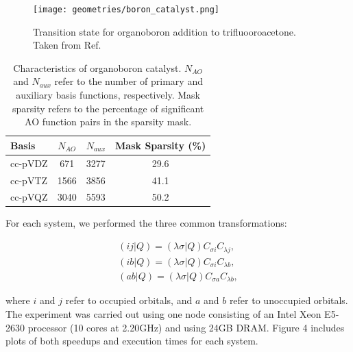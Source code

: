 \begin{figure}[H] 
\centering
\texttt{[image: geometries/boron\_catalyst.png]} \caption{Transition state for organoboron addition to trifluooroacetone. Taken from Ref. \cite{Lee:2016}} 
\label{fig:databases} \end{figure}

\begingroup
\begin{table}[H]
\centering
\renewcommand{\baselinestretch}{1}
\caption{Characteristics of organoboron catalyst.
$N_{AO}$ and $N_{aux}$ refer to the number of primary and auxiliary basis functions, respectively.
Mask sparsity refers to the percentage of significant AO function pairs in the sparsity mask.}
\begin{tabular}{l ccc}
\multicolumn{1}{l}{\textbf{Basis}} &
\multicolumn{1}{c}{\textbf{$N_{AO}$}} &
\multicolumn{1}{c}{\textbf{$N_{aux}$}} &
\multicolumn{1}{c}{\textbf{Mask Sparsity (\%)}} \\
\hline
cc-pVDZ   & 671  & 3277 & 29.6 \\          
cc-pVTZ   & 1566 & 3856 & 41.1 \\          
cc-pVQZ   & 3040 & 5593 & 50.2 \\          
\end{tabular}
\end{table}
\endgroup


\noindent For each system, we performed the three common transformations:

\begin{align} 
(i j | Q) = (\lambda \sigma | Q) C_{\sigma i} C_{\lambda j} , \\
(i b | Q) = (\lambda \sigma | Q) C_{\sigma i} C_{\lambda b} , \\
(a b | Q) = (\lambda \sigma | Q) C_{\sigma a} C_{\lambda b} , 
\end{align}

\noindent where $i$ and $j$ refer to occupied orbitals, and $a$ and $b$ refer to unoccupied orbitals.
The experiment was carried out using one node consisting of an Intel Xeon E5-2630 processor 
(10 cores at 2.20GHz) and using 24GB DRAM. Figure 4 includes plots of both speedups and execution times for each system.

